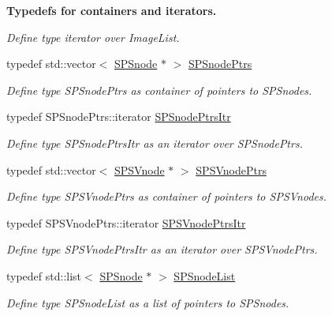 \begin{Indent}{\bf \-Typedefs for containers and iterators.}
\begin{DoxyCompactItemize}
\begin{DoxyCompactList}\small\item\em \-Define type iterator over \-Image\-List. \end{DoxyCompactList}\item 
typedef std\-::vector$<$ \hyperlink{classsubpavings_1_1SPSnode}{\-S\-P\-Snode} $\ast$ $>$ \hyperlink{namespacesubpavings_ad23942a388da964ca7487e496d0f2923}{\-S\-P\-Snode\-Ptrs}
\begin{DoxyCompactList}\small\item\em \-Define type \-S\-P\-Snode\-Ptrs as container of pointers to \-S\-P\-Snodes. \end{DoxyCompactList}\item 
typedef \-S\-P\-Snode\-Ptrs\-::iterator \hyperlink{namespacesubpavings_a3d06253195e32236cc10b1c2050073c9}{\-S\-P\-Snode\-Ptrs\-Itr}
\begin{DoxyCompactList}\small\item\em \-Define type \-S\-P\-Snode\-Ptrs\-Itr as an iterator over \-S\-P\-Snode\-Ptrs. \end{DoxyCompactList}\item 
typedef std\-::vector$<$ \hyperlink{classsubpavings_1_1SPSVnode}{\-S\-P\-S\-Vnode} $\ast$ $>$ \hyperlink{namespacesubpavings_a90b5f0e33fa46403066cc5a89929e6a9}{\-S\-P\-S\-Vnode\-Ptrs}
\begin{DoxyCompactList}\small\item\em \-Define type \-S\-P\-S\-Vnode\-Ptrs as container of pointers to \-S\-P\-S\-Vnodes. \end{DoxyCompactList}\item 
typedef \-S\-P\-S\-Vnode\-Ptrs\-::iterator \hyperlink{namespacesubpavings_ab5ab2047c25b17d5bb636a25ff65b0b0}{\-S\-P\-S\-Vnode\-Ptrs\-Itr}
\begin{DoxyCompactList}\small\item\em \-Define type \-S\-P\-S\-Vnode\-Ptrs\-Itr as an iterator over \-S\-P\-S\-Vnode\-Ptrs. \end{DoxyCompactList}\item 
typedef std\-::list$<$ \hyperlink{classsubpavings_1_1SPSnode}{\-S\-P\-Snode} $\ast$ $>$ \hyperlink{namespacesubpavings_ae7645253328c3b5fc137829039d971e3}{\-S\-P\-Snode\-List}
\begin{DoxyCompactList}\small\item\em \-Define type \-S\-P\-Snode\-List as a list of pointers to \-S\-P\-Snodes. \end{DoxyCompactList}\item 

\end{DoxyCompactItemize}
\end{Indent}
